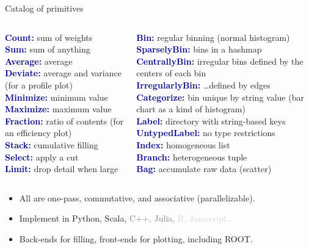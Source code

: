 \documentclass{beamer}
\begin{document}
\begin{frame}{Catalog of primitives}

\vspace{0.5 cm}
\begin{columns}
\textcolor{darkblue}{\bf Count:} sum of weights \\
\textcolor{darkblue}{\bf Sum:} sum of anything \\
\textcolor{darkblue}{\bf Average:} average \\
\textcolor{darkblue}{\bf Deviate:} average and variance (for a profile plot) \\
\textcolor{darkblue}{\bf Minimize:} minimum value \\
\textcolor{darkblue}{\bf Maximize:} maximum value \\
\textcolor{darkblue}{\bf Fraction:} ratio of contents (for an efficiency plot) \\
\textcolor{darkblue}{\bf Stack:} cumulative filling \\
\textcolor{darkblue}{\bf Select:} apply a cut \\
\textcolor{darkblue}{\bf Limit:} drop detail when large

\textcolor{darkblue}{\bf Bin:} regular binning (normal histogram) \\
\textcolor{darkblue}{\bf SparselyBin:} bins in a hashmap \\
\textcolor{darkblue}{\bf CentrallyBin:} irregular bins defined by the centers of each bin \\
\textcolor{darkblue}{\bf IrregularlyBin:} \ldots defined by edges \\
\textcolor{darkblue}{\bf Categorize:} bin unique by string value (bar chart as a kind of histogram) \\
\textcolor{darkblue}{\bf Label:} directory with string-based keys \\
\textcolor{darkblue}{\bf UntypedLabel:} no type restrictions \\
\textcolor{darkblue}{\bf Index:} homogeneous list \\
\textcolor{darkblue}{\bf Branch:} heterogeneous tuple \\
\textcolor{darkblue}{\bf Bag:} accumulate raw data (scatter) \\
\end{columns}

\vspace{0.25 cm}
\begin{itemize}
\item All are one-pass, commutative, and associative (parallelizable).
\item Implement in Python, Scala, \textcolor{gray}{C++, Julia,} \textcolor{lightgray}{R, Javascript\ldots}
\item Back-ends for filling, front-ends for plotting, including ROOT.
\end{itemize}
\end{frame}
\end{document}
